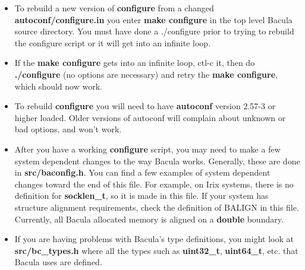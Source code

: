 \begin{itemize}
\item To rebuild a new version of {\bf configure} from a changed {\bf
   autoconf/configure.in}  you enter {\bf make configure} in the top level Bacula
   source  directory. You must have done a ./configure prior to trying to rebuild
 the configure script or it will get into an infinite loop. 
\item If the {\bf make configure} gets into an infinite loop, ctl-c it, then
   do  {\bf ./configure} (no options are necessary) and retry the  {\bf make
   configure}, which should now work. 
\item To rebuild {\bf configure} you will need to have {\bf autoconf} version 
   2.57-3 or higher loaded. Older versions of autoconf will complain about 
   unknown or bad options, and won't work. 
\item After you have a working {\bf configure} script, you may need to  make a
   few system dependent changes to the way Bacula works.  Generally, these are
   done in {\bf src/baconfig.h}. You can find  a few examples of system dependent
changes toward the end of this  file. For example, on Irix systems, there is
no definition for  {\bf socklen\_t}, so it is made in this file. If your
system has  structure alignment requirements, check the definition of BALIGN
in  this file. Currently, all Bacula allocated memory is aligned on a {\bf
double}  boundary. 
\item If you are having problems with Bacula's type definitions, you might 
   look at {\bf src/bc\_types.h} where all the types such as {\bf uint32\_t}, 
   {\bf uint64\_t}, etc. that Bacula uses are defined. 
\end{itemize}
